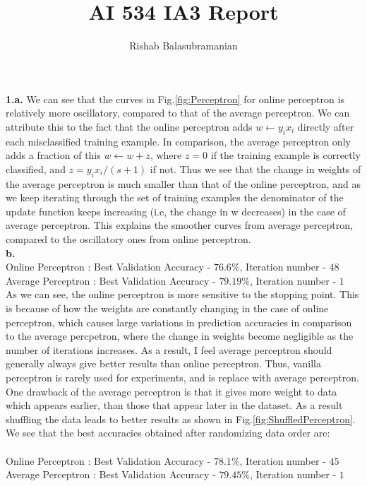 \documentclass{article}
\title{AI 534 IA3 Report}
\author{Rishab Balasubramanian}
\date{}
\begin{document}
\maketitle

\textbf{1.a.} We can see that the curves in Fig.\ref{fig:Perceptron} for online perceptron is relatively more oscillatory, compared to that of the average perceptron. We can attribute this to the fact that the online perceptron adds $w \leftarrow y_{i}x_{i}$ directly after each misclassified training example. In comparison, the average perceptron only adds a fraction of this $ w \leftarrow w + z$, where $z = 0$ if the training example is correctly classified, and $z = y_{i}x_{i}/(s+1)$ if not. Thus we see that the change in weights of the average perceptron is much smaller than that of the online perceptron, and as we keep iterating through the set of training examples the denominator of the update function keeps increasing (i.e, the change in w decreases) in the case of average perceptron. This explains the smoother curves from average perceptron, compared to the oscillatory ones from online perceptron.\\

\textbf{b.} \\
Online Perceptron : Best Validation Accuracy - $76.6\%$, Iteration number - $48$\\
Average Perceptron : Best Validation Accuracy - $79.19\%$, Iteration number - $1$\\

As we can see, the online perceptron is more sensitive to the stopping point. This is because of how the weights are constantly changing in the case of online perceptron, which causes large variations in prediction accuracies in comparison to the average percpetron, where the change in weights become negligible as the number of iterations increases. As a result, I feel average perceptron should generally always give better results than online perceptron. Thus, vanilla perceptron is rarely used for experiments, and is replace with average perceptron. One drawback of the average perceptron is that it gives more weight to data which appears earlier, than those that appear later in the dataset. As a result shuffling the data leads to better results as shown in Fig.\ref{fig:ShuffledPerceptron}. We see that the best accuracies obtained after randomizing data order are:\\ \\
Online Perceptron : Best Validation Accuracy - $78.1\%$, Iteration number - $45$\\
Average Perceptron : Best Validation Accuracy - $79.45\%$, Iteration number - $1$
\end{document}
